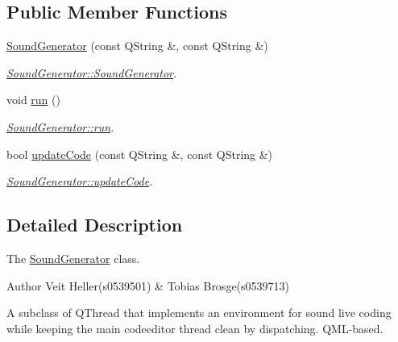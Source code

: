 \subsection*{Public Member Functions}
\begin{DoxyCompactItemize}
\item 
\hyperlink{classSoundGenerator_a2b80d41c44e091422cdcb6b4e18a2f4e}{Sound\+Generator} (const Q\+String \&, const Q\+String \&)
\begin{DoxyCompactList}\small\item\em \hyperlink{classSoundGenerator_a2b80d41c44e091422cdcb6b4e18a2f4e}{Sound\+Generator\+::\+Sound\+Generator}. \end{DoxyCompactList}\item 
void \hyperlink{classSoundGenerator_acf7c58cd0d9ec25652bfbe9e2e27142f}{run} ()
\begin{DoxyCompactList}\small\item\em \hyperlink{classSoundGenerator_acf7c58cd0d9ec25652bfbe9e2e27142f}{Sound\+Generator\+::run}. \end{DoxyCompactList}\item 
bool \hyperlink{classSoundGenerator_a69366b95a600f0520603a9848c4fc17f}{update\+Code} (const Q\+String \&, const Q\+String \&)
\begin{DoxyCompactList}\small\item\em \hyperlink{classSoundGenerator_a69366b95a600f0520603a9848c4fc17f}{Sound\+Generator\+::update\+Code}. \end{DoxyCompactList}\end{DoxyCompactItemize}


\subsection{Detailed Description}
The \hyperlink{classSoundGenerator}{Sound\+Generator} class. 

\begin{DoxyAuthor}{Author}
Veit Heller(s0539501) \& Tobias Brosge(s0539713)
\end{DoxyAuthor}
A subclass of Q\+Thread that implements an environment for sound live coding while keeping the main codeeditor thread clean by dispatching. Q\+M\+L-\/based. 

